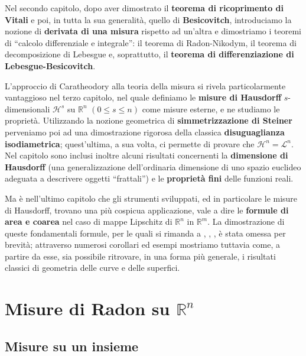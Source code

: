 \documentclass[a4paper,10pt,openright,oneside]{book}
\theoremstyle{theoremstyle}
\theoremstyle{theoremstylewoheader}
\theoremstyle{theoremstyle}
\theoremstyle{proofsecstyle}
\theoremstyle{nonumberplain}
\newcommand{\RR}{\ensuremath{\mathbb{R}}}
\newcommand{\Leb}{\ensuremath{\mathcal{L}}}
\newcommand{\Haus}{\ensuremath{\mathcal{H}}}
\begin{document}
Nel secondo capitolo, dopo aver dimostrato il {\bfseries teorema di ricoprimento di Vitali} e poi, in tutta la sua generalità, quello di {\bfseries Besicovitch}, introduciamo la nozione di {\bfseries derivata di una misura} rispetto ad un'altra e dimostriamo i teoremi di ``calcolo differenziale e integrale'': il teorema di Radon-Nikodym, il teorema di decomposizione di Lebesgue e, soprattutto, il {\bfseries teorema di differenziazione di Lebesgue-Besicovitch}.

L'approccio di Caratheodory alla teoria della misura si rivela particolarmente vantaggioso nel terzo capitolo, nel quale definiamo le {\bfseries misure di Hausdorff} $s$-dimensionali $\Haus^s$ su $\RR^n$ $(0 \le s \le n)$ come misure esterne, e ne studiamo le proprietà. Utilizzando la nozione geometrica di {\bfseries simmetrizzazione di Steiner} perveniamo poi ad una dimostrazione rigorosa della classica {\bfseries disuguaglianza isodiametrica}; quest'ultima, a sua volta, ci permette di provare che $\Haus^n = \Leb^n$. Nel capitolo sono inclusi inoltre alcuni risultati concernenti la {\bfseries dimensione di Hausdorff} (una generalizzazione dell'ordinaria dimensione di uno spazio euclideo adeguata a descrivere oggetti ``frattali'') e le {\bfseries proprietà fini} delle funzioni reali.

Ma è nell'ultimo capitolo che gli strumenti sviluppati, ed in particolare le misure di Hausdorff, trovano una più cospicua applicazione, vale a dire le {\bfseries formule di area e coarea} nel caso di mappe Lipschitz di $\RR^n$ in $\RR^m$. La dimostrazione di queste fondamentali formule, per le quali si rimanda a \cite{federer}, \cite{evans}, \cite{fusco}, è stata omessa per brevità; attraverso numerosi corollari ed esempi mostriamo tuttavia come, a partire da esse, sia possibile ritrovare, in una forma più generale, i risultati classici di geometria delle curve e delle superfici. 


\chapter[Misure di Radon]{Misure di Radon su $\RR^n$}

\section{Misure su un insieme}
\end{document}
